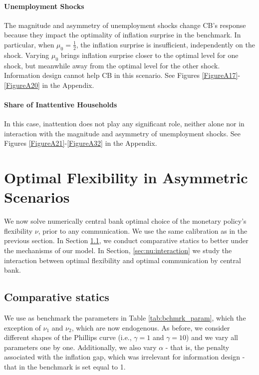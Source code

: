 \documentclass[12pt,a4paper]{article}
\begin{document}
\paragraph{Unemployment Shocks}
The magnitude and asymmetry of unemployment shocks change CB's response because they impact the optimality of inflation surprise in the benchmark. In particular, when $\mu_0=\frac{1}{2}$, the inflation surprise is insufficient, independently on the shock. Varying $\mu_0$ brings inflation surprise closer to the optimal level for one shock, but meanwhile away from the optimal level for the other shock. Information design cannot help CB in this scenario. See Figures \ref{FigureA17}-\ref{FigureA20} in the Appendix.


\paragraph{Share of Inattentive Households}
\label{sec:nu}
In this case, inattention does not play any significant role, neither alone nor in interaction with the magnitude and asymmetry of unemployment shocks. See Figures \ref{FigureA21}-\ref{FigureA32} in the Appendix.

\section{Optimal Flexibility in Asymmetric Scenarios} 
We now solve numerically central bank optimal choice of the monetary policy's flexibility $\nu$, prior to any communication. We use the same calibration as in the previous section. In Section \ref{sec:nu:compare}, we conduct comparative statics to better under the mechanisms of our model. In Section, \ref{sec:nu:interaction} we study the interaction between optimal flexibility and optimal communication by central bank.

\subsection{Comparative statics}
\label{sec:nu:compare}
We use as benchmark the parameters in Table \ref{tab:bchmrk_param}, which the exception of $\nu_1$ and $\nu_2$, which are now endogenous. As before, we consider different shapes of the Phillips curve (i.e., $\gamma=1$ and $\gamma=10$) and we vary all parameters one by one. Additionally, we also vary $\alpha$ - that is, the penalty associated with the inflation gap, which was irrelevant for information design - that in the benchmark is set equal to 1.
\end{document}
